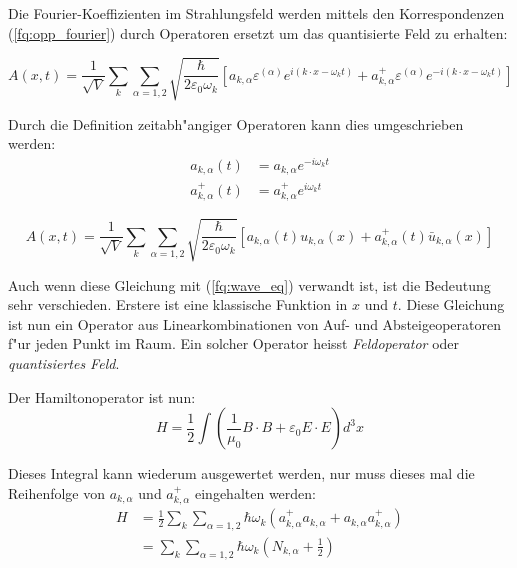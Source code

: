 Die Fourier-Koeffizienten im Strahlungsfeld werden mittels den Korrespondenzen (\ref{fq:opp_fourier}) durch Operatoren ersetzt um das quantisierte Feld zu erhalten:

\begin{equation*}
A(x,t) = \frac{1}{\sqrt{V}} \sum_k \sum_{\alpha=1,2} \sqrt{\frac{\hbar}{2 \varepsilon_0 \omega_k}} \left[a_{k,\alpha} \varepsilon^{(\alpha)} e^{i (k \cdot x - \omega_k t)} + a^+_{k,\alpha} \varepsilon^{(\alpha)} e^{-i (k \cdot x - \omega_k t)}\right]
\end{equation*}

Durch die Definition zeitabh"angiger Operatoren kann dies umgeschrieben werden:
\begin{align*}
a_{k,\alpha}(t) &= a_{k,\alpha} e^{-i \omega_k t} \\
a^+_{k,\alpha}(t) &= a^+_{k,\alpha} e^{i \omega_k t}
\end{align*}

\begin{equation*}
A(x,t) = \frac{1}{\sqrt{V}} \sum_k \sum_{\alpha=1,2} \sqrt{\frac{\hbar}{2 \varepsilon_0 \omega_k}}\left[a_{k,\alpha}(t) u_{k,\alpha}(x) + a^+_{k,\alpha}(t) \bar{u}_{k,\alpha}(x) \right]
\end{equation*}

Auch wenn diese Gleichung mit (\ref{fq:wave_eq}) verwandt ist, ist die Bedeutung sehr verschieden. Erstere ist eine klassische Funktion in $x$ und $t$. Diese Gleichung ist nun ein Operator aus Linearkombinationen von Auf- und Absteigeoperatoren f"ur jeden Punkt im Raum. Ein solcher Operator heisst {\em Feldoperator} oder {\em quantisiertes Feld}.

Der Hamiltonoperator ist nun:
\begin{equation*}
H = \frac{1}{2} \int \left(\frac{1}{\mu_0} B \cdot B + \varepsilon_0 E \cdot E \right) d^3 x
\end{equation*}

Dieses Integral kann wiederum ausgewertet werden, nur muss dieses mal die Reihenfolge von $a_{k,\alpha}$ und $a^+_{k,\alpha}$ eingehalten werden:
\begin{equation*}
\begin{split}
H &= \frac{1}{2} \sum_k \sum_{\alpha=1,2} \hbar \omega_k \left(a^+_{k,\alpha} a_{k,\alpha} + a_{k,\alpha} a^+_{k,\alpha}\right) \\
&= \sum_k \sum_{\alpha=1,2} \hbar \omega_k \left(N_{k,\alpha} + \frac{1}{2} \right)
\end{split}
\end{equation*}

